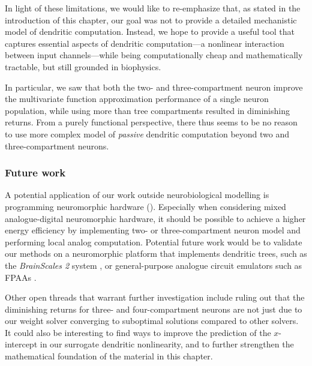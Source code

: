 In light of these limitations, we would like to re-emphasize that, as stated in the introduction of this chapter, our goal was not to provide a detailed mechanistic model of dendritic computation.
Instead, we hope to provide a useful tool that captures essential aspects of dendritic computation---a nonlinear interaction between input channels---while being computationally cheap and mathematically tractable, but still grounded in biophysics.

In particular, we saw that both the two- and three-compartment neuron improve the multivariate function approximation performance of a single neuron population, while using more than tree compartments resulted in diminishing returns.
From a purely functional perspective, there thus seems to be no reason to use more complex model of \emph{passive} dendritic computation beyond two and three-compartment neurons.

\subsubsection{Future work}
A potential application of our work outside neurobiological modelling is programming neuromorphic hardware ().
Especially when considering mixed analogue-digital neuromorphic hardware, it should be possible to achieve a higher energy efficiency by implementing two- or three-compartment neuron model and performing local analog computation.
Potential future work would be to validate our methods on a neuromorphic platform that implements dendritic trees, such as the \emph{BrainScales 2} system \citep{schemmel2017accelerated}, or general-purpose analogue circuit emulators such as FPAAs \citep[e.g.,][]{george2016programmable}.

Other open threads that warrant further investigation include ruling out that the diminishing returns for three- and four-compartment neurons are not just due to our weight solver converging to suboptimal solutions compared to other solvers.
It could also be interesting to find ways to improve the prediction of the $x$-intercept in our surrogate dendritic nonlinearity, and to further strengthen the mathematical foundation of the material in this chapter.